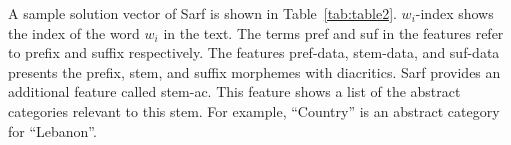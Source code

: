 %	



A sample solution vector of Sarf is shown in Table~\ref{tab:table2}. 
$w_{i}$-index shows the index of the word $w_{i}$ in the text. 
The terms pref and suf in the features refer to prefix and suffix respectively. 
The features pref-data, stem-data, and suf-data presents the prefix, stem, and suffix morphemes with diacritics. 
Sarf provides an additional feature called stem-ac. 
This feature shows a list of the abstract categories relevant to this stem. 
For example, ``Country'' is an abstract category for ``Lebanon''.

